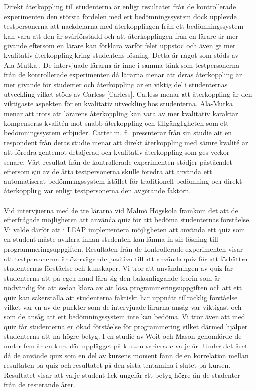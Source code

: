 \documentclass[a4paper,11pt]{article}
\begin{document}
{\\
\\
Direkt återkoppling till studenterna är enligt resultatet från de kontrollerade experimenten den största fördelen med ett bedömningssystem dock upplevde testpersonerna att nackdelarna med återkopplingen från ett bedömningssystem kan vara att den är svårförstådd och att återkopplingen från en lärare är mer givande eftersom en lärare kan förklara varför felet uppstod och även ge mer kvalitativ återkoppling kring studentens lösning. Detta är något som stöds av Ala-Mutka \cite{ala-mutka}. De intervjuade lärarna är inne i samma tänk som testpersonerna från de kontrollerade experimenten då lärarna menar att deras återkoppling är mer givande för studenter och återkoppling är en viktig del i studenternas utveckling vilket stöds av Carless [Carless]. Carless menar att återkoppling är den viktigaste aspekten för en kvalitativ utveckling hos studenterna. Ala-Mutka \cite{ala-mutka} menar att trots att lärarens återkoppling kan vara av mer kvalitativ karaktär kompenseras kvalitén mot snabb återkoppling och tillgängligheten som ett bedömningssystem erbjuder. Carter m. fl. \cite{carter} presenterar från sin studie att en respondent från deras studie menar att direkt återkoppling med sämre kvalité är att föredra gentemot detaljerad och kvalitativ återkoppling som ges veckor senare. Vårt resultat från de kontrollerade experimenten stödjer påståendet eftersom sju av de åtta testpersonerna skulle föredra att använda ett automatiserat bedömningssystem istället för traditionell bedömning och direkt återkoppling var enligt testpersonerna den avgörande faktorn.
\\
\\
Vid intervjuerna med de tre lärarna vid Malmö Högskola framkom det att de efterfrågade möjligheten att använda quiz för att bedöma studenternas förståelse. Vi valde därför att i LEAP implementera möjligheten att använda ett quiz som en student måste avklara innan studenten kan lämna in sin lösning till programmeringsuppgiften. Resultaten från de kontrollerade experimenten visar att testpersonerna är övervägande positiva till att använda quiz för att förbättra studenternas förståelse och kunskaper. Vi tror att användningen av quiz får studenterna att på egen hand lära sig den bakomliggande teorin som är nödvändig för att sedan klara av att lösa programmeringsuppgiften och att ett quiz kan säkerställa att studenterna faktiskt har uppnått tillräcklig förståelse vilket var en av de punkter som de intervjuade lärarna ansåg var viktigast och som de ansåg att ett bedömningssystem inte kan bedöma. Vi tror även att med quiz får studenterna en ökad förståelse för programmering vilket därmed hjälper studenterna att nå högre betyg. I en studie av Woit och Mason \cite{woit_2003} genomförde de under fem år en kurs där upplägget på kursen varierade varje år. Under det året då de använde quiz som en del av kursens moment fann de en korrelation mellan resultaten på quiz och resultatet på den sista tentamina i slutet på kursen. Resultatet visar att varje student fick ungefär ett betyg högre än de studenter från de resterande åren.  
}
\end{document}
